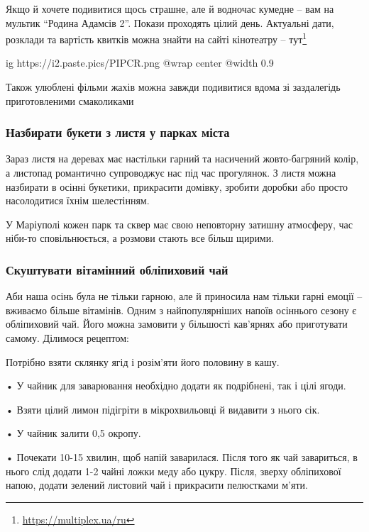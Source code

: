 Якщо й хочете подивитися щось страшне, але й водночас кумедне – вам на мультик
\enquote{Родина Адамсів 2}. Покази проходять цілий день. Актуальні дати,
розклади та вартість квитків можна знайти на сайті кінотеатру –
тут\footnote{\url{https://multiplex.ua/ru}}

\ifcmt
  ig https://i2.paste.pics/PIPCR.png
  @wrap center
  @width 0.9
\fi

Також улюблені фільми жахів можна завжди подивитися вдома зі заздалегідь
приготовленими смаколиками 🙂

\subsubsection{Назбирати букети з листя у парках міста}

Зараз листя на деревах має настільки гарний та насичений жовто-багряний колір,
а листопад романтично супроводжує нас під час прогулянок. З листя можна
назбирати в осінні букетики, прикрасити домівку, зробити доробки або просто
насолодитися їхнім шелестінням.

У Маріуполі кожен парк та сквер має свою неповторну затишну атмосферу, час
ніби-то сповільнюється, а розмови стають все більш щирими.


\subsubsection{Скуштувати вітамінний обліпиховий чай}

Аби наша осінь була не тільки гарною, але й приносила нам тільки гарні емоції –
вживаємо більше вітамінів. Одним з найпопулярніших напоїв осіннього сезону є
обліпиховий чай. Його можна замовити у більшості кав'ярнях або приготувати
самому. Ділимося рецептом:

Потрібно взяти склянку ягід і розім'яти його половину в кашу. 

• У чайник для заварювання необхідно додати як подрібнені, так і цілі ягоди. 

• Взяти цілий лимон підігріти в мікрохвильовці й видавити з нього сік. 

• У чайник залити 0,5 окропу. 

• Почекати 10-15 хвилин, щоб напій заварилася. Після того як чай завариться, в
нього слід додати 1-2 чайні ложки меду або цукру. Після, зверху обліпихової
напою, додати зелений листовий чай і прикрасити пелюстками м'яти.

